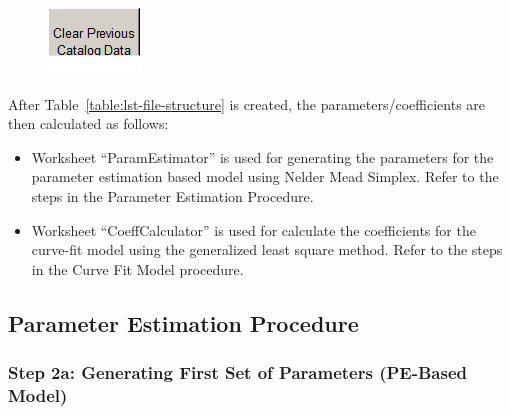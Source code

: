 \begin{figure}[htbp]
\centering
\includegraphics{media/image048.png}
\caption{}
\end{figure}

After Table~\ref{table:lst-file-structure} is created, the parameters/coefficients are then calculated as follows:

\begin{itemize}
\item
  Worksheet ``ParamEstimator'' is used for generating the parameters for the parameter estimation based model using Nelder Mead Simplex. Refer to the steps in the Parameter Estimation Procedure.
\item
  Worksheet ``CoeffCalculator'' is used for calculate the coefficients for the curve-fit model using the generalized least square method. Refer to the steps in the Curve Fit Model procedure.
\end{itemize}

\subsection{Parameter Estimation Procedure}\label{parameter-estimation-procedure-000}

\subsubsection{Step 2a: Generating First Set of Parameters (PE-Based Model)}\label{step-2a-generating-first-set-of-parameters-pe-based-model-000}

